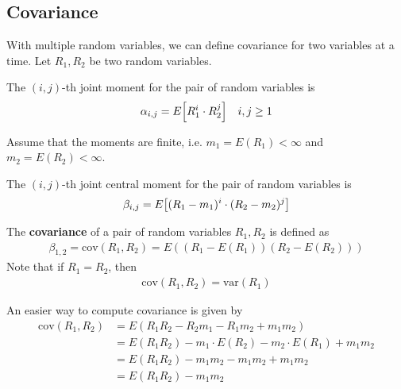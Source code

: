 \subsection{Covariance}
With multiple random variables, we can define covariance for two variables at a time. Let $R_1,R_2$ be two random variables.
\begin{definition}
     The $(i,j)$-th joint moment for the pair of random variables is
    \begin{align}
        \alpha_{i,j} = E\qty[R_1^i \cdot R_2^j] && i,j \ge 1
    \end{align}
\end{definition}
Assume that the moments are finite, i.e. $m_1 = E(R_1) < \infty$ and $m_2 = E(R_2) < \infty$.
\begin{definition}
    The $(i,j)$-th joint central moment for the pair of random variables is
    \begin{align}
        \beta_{i,j} = E\qty[(R_1 - m_1)^i \cdot (R_2 - m_2)^j]
    \end{align}
\end{definition}
\begin{definition}
    The \textbf{covariance} of a pair of random variables $R_1,R_2$ is defined as
    \begin{align}
        \beta_{1,2} = \text{cov}(R_1, R_2) = E((R_1 - E(R_1)) (R_2 - E(R_2)))
    \end{align}
    Note that if $R_1 = R_2$, then
    \begin{align}
        \text{cov}(R_1,R_2) = \text{var}(R_1)
    \end{align}
\end{definition}
\begin{proposition}
    An easier way to compute covariance is given by
    \begin{align}
        \text{cov}(R_1,R_2) &= E(R_1R_2 - R_2m_1 - R_1m_2 + m_1m_2)\\
        &= E(R_1R_2) - m_1 \cdot E(R_2) - m_2 \cdot E(R_1) + m_1m_2\\
        &= E(R_1R_2) - m_1 m_2 - m_1 m_2 + m_1m_2\\
        &= E(R_1R_2) - m_1 m_2
    \end{align}
\end{proposition}

